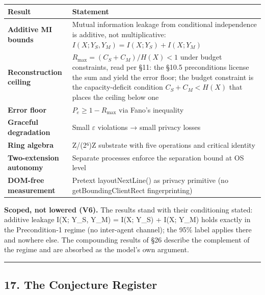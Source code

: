 \documentclass[
]{article}
\newcounter{none} %
\begin{document}
{\def\LTcaptype{none} %
\begin{longtable}[]{@{}
  >{\raggedright\arraybackslash}p{}
  >{\raggedright\arraybackslash}p{}@{}}
\toprule\noalign{}
\begin{minipage}[b]{\linewidth}\raggedright
Result
\end{minipage} & \begin{minipage}[b]{\linewidth}\raggedright
Statement
\end{minipage} \\
\midrule\noalign{}
\endhead
\bottomrule\noalign{}
\endlastfoot
\textbf{Additive MI bounds} & Mutual information leakage from
conditional independence is additive, not multiplicative:
\(I(X; Y_S, Y_M) = I(X; Y_S) + I(X; Y_M)\) \\
\textbf{Reconstruction ceiling} & \(R_{\max} = (C_S + C_M)/H(X) < 1\)
under budget constraints, read per §11: the §10.5 preconditions license
the sum and yield the error floor; the budget constraint is the
capacity-deficit condition \(C_S + C_M < H(X)\) that places the ceiling
below one \\
\textbf{Error floor} & \(P_e \geq 1 - R_{\max}\) via Fano's
inequality \\
\textbf{Graceful degradation} & Small \(\varepsilon\) violations → small
privacy losses \\
\textbf{Ring algebra} & Z/(2⁶)Z substrate with five operations and
critical identity \\
\textbf{Two-extension autonomy} & Separate processes enforce the
separation bound at OS level \\
\textbf{DOM-free measurement} & Pretext layoutNextLine() as privacy
primitive (no getBoundingClientRect fingerprinting) \\
\end{longtable}
}

\textbf{Scoped, not lowered (V6).} The results stand with their
conditioning stated: additive leakage I(X; Y\_S, Y\_M) = I(X; Y\_S) +
I(X; Y\_M) holds exactly in the Precondition-1 regime (no inter-agent
channel); the 95\% label applies there and nowhere else. The compounding
results of §26 describe the complement of the regime and are absorbed as
the model's own argument.

\begin{center}\rule{0.5\linewidth}{0.5pt}\end{center}

\subsection{17. The Conjecture Register}\label{the-conjecture-register}
\end{document}
